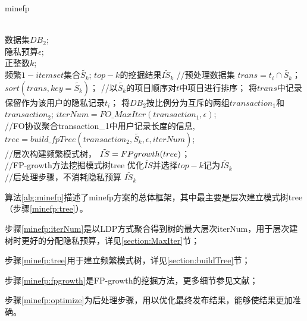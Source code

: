 \documentclass[UTF8]{ctexart}
\begin{document}
\begin{algorithm}[t]
    \caption{minefp}
    \label{alg:minefp}
        \begin{algorithmic}[1]
			 \REQUIRE ~~\\
			 数据集$DB_2$;\\
			 隐私预算$\epsilon$;\\
			 正整数$k$;\\
			 频繁$1-itemset$集合$\tilde{S_k}$;
			 \ENSURE $top-k$的挖掘结果$\tilde{IS_k}$
                 \STATE //预处理数据集
                 \STATE $trans = t_i \cap \tilde{S_k}$；
                 \STATE $sort(trans,key=\tilde{S_k})$；  //以$\tilde{S_k}$的项目顺序对$t$中项目进行排序；
                 \STATE 将$trans$中记录保留作为该用户的隐私记录$t_i$；
                 \ENDFOR
                 \STATE 将$DB_2$按比例分为互斥的两组$transaction_1$和$transaction_2$;
                 \label{minefp:group}
			 \STATE $iterNum = FO\_MaxIter(transaction_1,\epsilon)$; \\ //FO协议聚合transaction\_1中用户记录长度的信息,%
			 \label{minefp:iterNum}
			 \STATE $tree = build\_fpTree(transaction_2,\tilde{S_k},\epsilon,iterNum)$; \\ //层次构建频繁模式树，%
			 \label{minefp:tree}
			 \STATE $\tilde{IS} = FP\-growth(tree)$； \\ //FP-growth方法挖掘模式树tree
                 \label{minefp:fpgrowth}
			 \STATE 优化$\tilde{IS}$并选择$top-k$记为$\tilde{IS_k}$ \\ //后处理步骤，不消耗隐私预算
                 \label{minefp:optimize}
                 \RETURN $\tilde{IS_k}$
        \end{algorithmic}
\end{algorithm}


算法\ref{alg:minefp}描述了minefp方案的总体框架，其中最主要是层次建立模式树tree（步骤\ref{minefp:tree}）。

步骤\ref{minefp:iterNum}是以LDP方式聚合得到树的最大层次iterNum，用于层次建树时更好的分配隐私预算，详见\ref{section:MaxIter}节；

步骤\ref{minefp:tree}用于建立频繁模式树，详见\ref{section:buildTree}节；

步骤\ref{minefp:fpgrowth}是FP-growth的挖掘方法，更多细节参见文献\cite{han2000mining}；

步骤\ref{minefp:optimize}为后处理步骤，用以优化最终发布结果，能够使结果更加准确。
\end{document}
